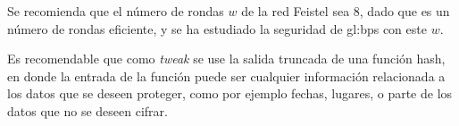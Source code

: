 
Se recomienda que el número de rondas $w$ de la red Feistel sea $8$, dado
que es un número de rondas eficiente, y se ha estudiado la seguridad de
\gls{gl:bps} con este $w$.

Es recomendable que como \textit{tweak} se use la salida truncada de una función
hash, en donde la entrada de la función puede ser cualquier información
relacionada a los datos que se deseen proteger, como por ejemplo fechas, lugares,
o parte de los datos que no se deseen cifrar.
